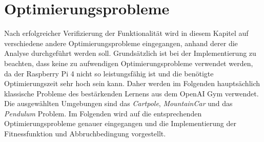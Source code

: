 \section{Optimierungsprobleme}
\label{sec:analysis_optimzation_problems}
Nach erfolgreicher Verifizierung der Funktionalität wird in diesem Kapitel auf verschiedene andere Optimierungsprobleme eingegangen, anhand derer die Analyse durchgeführt werden soll. Grundsätzlich ist bei der Implementierung zu beachten, dass keine zu aufwendigen Optimierungsprobleme verwendet werden, da der Raspberry Pi 4 nicht so leistungsfähig ist und die benötigte Optimierungszeit sehr hoch sein kann. Daher werden im Folgenden hauptsächlich klassische Probleme des bestärkenden Lernens aus dem OpenAI Gym verwendet. Die ausgewählten Umgebungen sind das \emph{Cartpole}, \emph{MountainCar} und das \emph{Pendulum} Problem. Im Folgenden wird auf die entsprechenden Optimierungsprobleme genauer eingegangen und die Implementierung der Fitnessfunktion und Abbruchbedingung vorgestellt. 

